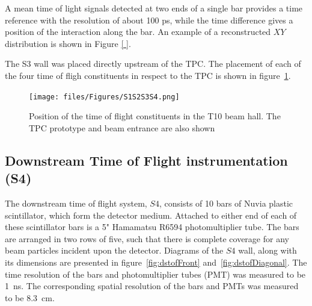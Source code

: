 A mean time of light signals detected at two ends of a single bar provides a time reference with the resolution of about 100 ps, while the time difference gives a position of the interaction along the bar. An example of a reconstructed $XY$ distribution is shown in Figure \ref{ }.

    
    
    The S3 wall was placed directly upstream of the TPC.
    The placement of each of the four time of fligh constituents in respect to the TPC is shown in figure~\ref{fig:S1S2S3S4}.
    \begin{figure}
      \centering
    \texttt{[image: files/Figures/S1S2S3S4.png]}
    	\caption{Position of the time of flight constituents in the T10 beam hall. The TPC prototype and beam entrance are also shown}
    		\label{fig:S1S2S3S4}
    \end{figure}
    



	\subsection{Downstream Time of Flight instrumentation (S4)}
	
    The downstream time of flight system, $S4$, consists of 10 bars of Nuvia plastic scintillator, which form the detector medium. 
    Attached to either end of each of these scintillator bars is a 5" Hamamatsu R6594 photomultiplier tube. 
    The bars are arranged in two rows of five, such that there is complete coverage for any beam particles incident upon the detector. 
    Diagrams of the $S4$ wall, along with its dimensions are presented in figure~\ref{fig:dstofFront} and~\ref{fig:dstofDiagonal}.
    The time resolution of the bars and photomultiplier tubes (PMT) was measured to be 1~ns. The corresponding spatial resolution of the bars and PMTs was measured to be 8.3~cm.
    
